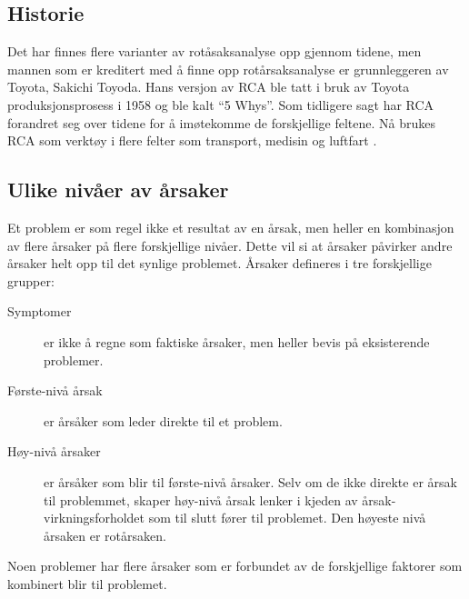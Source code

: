\subsection{Historie}
Det har finnes flere varianter av rotåsaksanalyse opp gjennom tidene, men mannen som er kreditert med å finne opp rotårsaksanalyse er grunnleggeren av Toyota, Sakichi Toyoda. Hans versjon av RCA ble tatt i bruk av Toyota produksjonsprosess i 1958 og ble kalt ``5 Whys''. Som tidligere sagt har RCA forandret seg over tidene for å imøtekomme de forskjellige feltene. Nå brukes RCA som verktøy i flere felter som transport, medisin og luftfart \cite{Teori}. 
    
\subsection{Ulike nivåer av årsaker}
Et problem er som regel ikke et resultat av en årsak, men heller en kombinasjon av flere årsaker på flere forskjellige nivåer. Dette vil si at årsaker påvirker andre årsaker helt opp til det synlige problemet. Årsaker defineres i tre forskjellige grupper: 

\begin{description}
    \item[Symptomer] er ikke å regne som faktiske årsaker, men heller bevis på eksisterende problemer.
    \item[Første-nivå årsak] er årsåker som leder direkte til et problem.
    \item[Høy-nivå årsaker] er årsåker som blir til første-nivå årsaker. Selv om de ikke direkte er årsak til problemmet, skaper høy-nivå årsak lenker i kjeden av årsak-virkningsforholdet som til slutt fører til problemet. Den høyeste nivå årsaken er rotårsaken.  
\end{description}
Noen problemer har flere årsaker som er forbundet av de forskjellige faktorer som kombinert blir til problemet.

